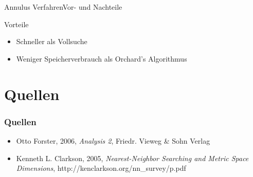 \documentclass{beamer}
\begin{document}
\begin{frame}{Annulus Verfahren}{Vor- und Nachteile}
 \begin{block}{Vorteile}
  \begin{itemize}
   \item Schneller als Vollsuche
   \item Weniger Speicherverbrauch als Orchard’s Algorithmus
  \end{itemize}
 \end{block}
\end{frame}

\section{Quellen}
\begin{frame}
 \frametitle{Quellen}
 \begin{itemize}
  \item Otto Forster, 2006, \textit{Analysis 2}, Friedr. Vieweg \& Sohn Verlag
  \item Kenneth L. Clarkson, 2005, \textit{Nearest-Neighbor Searching and Metric Space Dimensions}, http://kenclarkson.org/nn\_survey/p.pdf
  \end{itemize}
\end{frame}
\end{document}
